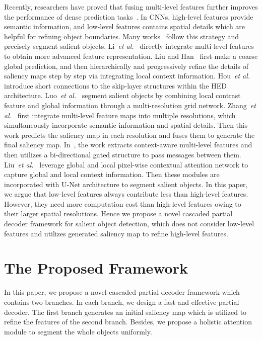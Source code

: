 \documentclass[10pt,twocolumn,letterpaper]{article}
\begin{document}
Recently, researchers have proved that fusing multi-level features further improves the performance of dense prediction tasks~\cite{2015HyperColumn,2015UNet}. In CNNs, high-level features provide semantic information, and low-level features contains spatial details which are helpful for refining object boundaries. Many works~\cite{2018DSS,2016DCL,2016DHS,2018PiCANet,2017NLDF,2018BMPM,2017Amulet} follow this strategy and precisely segment salient objects. Li~\emph{et al.}~\cite{2016DCL} directly integrate multi-level features to obtain more advanced feature representation. Liu and Han~\cite{2016DHS} first make a coarse global prediction, and then hierarchically and progressively refine the details of saliency maps step by step via integrating local context information. Hou~\emph{et al.}~\cite{2018DSS} introduce short connections to the skip-layer structures within the HED~\cite{2015HED} architecture. Luo~\emph{et al.}~\cite{2017NLDF} segment salient objects by combining local contrast feature and global information through a multi-resolution  grid network. Zhang~\emph{et al.}~\cite{2017Amulet} first integrate multi-level feature maps into multiple resolutions, which simultaneously incorporate semantic information and spatial details. Then this work predicts the saliency map in each resolution and fuses them to generate the final saliency map. In~\cite{2018BMPM}, the work extracts context-aware multi-level features and then utilizes a bi-directional gated structure to pass messages between them. Liu~\emph{et al.}~\cite{2018PiCANet} leverage global and local pixel-wise contextual attention network to capture global and local context information. Then these modules are incorporated with U-Net architecture to segment salient objects. In this paper, we argue that low-level features always contribute less than high-level features. However, they need more computation cost than high-level features owing to their larger spatial resolutions. Hence we propose a novel cascaded partial decoder framework for salient object detection, which does not consider low-level features and utilizes generated saliency map to refine high-level features.


\section{The Proposed Framework}
In this paper, we propose a novel cascaded partial decoder framework which contains two branches. In each branch, we design a fast and effective partial decoder. The first branch generates an initial saliency map which is utilized to refine the features of the second branch. Besides, we propose a holistic attention module to segment the whole objects uniformly.
\end{document}

